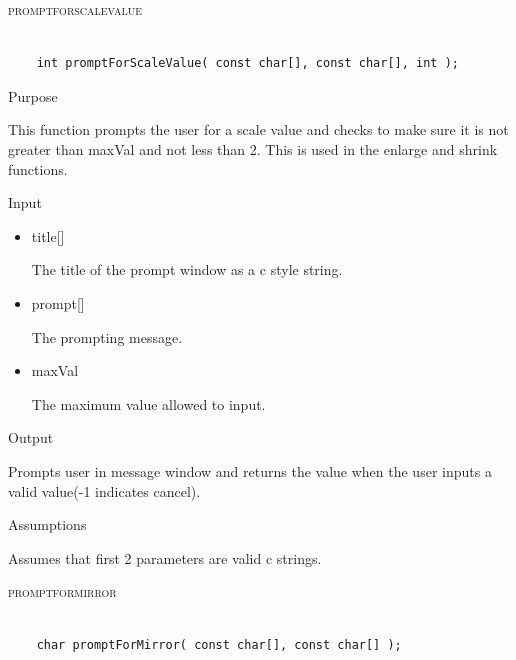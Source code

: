 \documentclass[pdftex, 11pt]{article}
\begin{document}
\begin{description}
\begin{description}
		\end{description}



	\item{\textsc{promptforscalevalue}}

		\begin{lstlisting}

	int promptForScaleValue( const char[], const char[], int );
		\end{lstlisting}

		\begin{description}
			\item{Purpose}

				This function prompts the user for a scale value and checks to make sure it
				is not greater than maxVal and not less than 2.  This is used in the enlarge
				and shrink functions.

			\item{Input}

				\begin{itemize}
					
					\item{title[]}

						The title of the prompt window as a c style string.

					\item{prompt[]}

						The prompting message.

					\item{maxVal}

						The maximum value allowed to input.

				\end{itemize}

			\item{Output}

				Prompts user in message window and returns the value when
				the user inputs a valid value(-1 indicates cancel).

			\item{Assumptions}

				Assumes that first 2 parameters are valid c strings.

		\end{description}


	\item{\textsc{promptformirror}}

		\begin{lstlisting}

	char promptForMirror( const char[], const char[] );
		\end{lstlisting}


\end{description}
\end{document}
